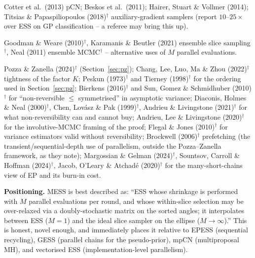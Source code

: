 \documentclass[11pt,a4paper]{article}
\theoremstyle{remark}
\begin{document}
\begin{description}[leftmargin=*,style=nextline]
\item[Function-space / dimension-robust samplers] Cotter et al.\ (2013) pCN; Beskos et al.\ (2011); Hairer, Stuart \& Vollmer (2014); Titsias \& Papaspiliopoulos (2018)$^\dagger$ auxiliary-gradient samplers (report $10$--$25\times$ over ESS on GP classification -- a referee may bring this up).
\item[Ensemble / population methods] Goodman \& Weare (2010)$^\dagger$, Karamanis \& Beutler (2021) ensemble slice sampling$^\dagger$, Neal (2011) ensemble MCMC$^\dagger$ -- alternative uses of $M$ parallel evaluations.
\item[Fundamental limits, non-reversibility, many short chains] Pozza \& Zanella (2024)$^\dagger$ (Section~\ref{sec:pz}); Chang, Lee, Luo, Ma \& Zhou (2022)$^\dagger$ tightness of the factor $K$; Peskun (1973)$^\dagger$ and Tierney (1998)$^\dagger$ for the ordering used in Section~\ref{sec:pz}; Bierkens (2016)$^\dagger$ and Sun, Gomez \& Schmidhuber (2010)$^\dagger$ for ``non-reversible $\le$ symmetrised'' in asymptotic variance; Diaconis, Holmes \& Neal (2000)$^\dagger$, Chen, Lov\'asz \& Pak (1999)$^\dagger$, Andrieu \& Livingstone (2021)$^\dagger$ for what non-reversibility can and cannot buy; Andrieu, Lee \& Livingstone (2020)$^\dagger$ for the involutive-MCMC framing of the proof; Flegal \& Jones (2010)$^\dagger$ for variance estimators valid without reversibility; Brockwell (2006)$^\dagger$ prefetching (the transient/sequential-depth use of parallelism, outside the Pozza--Zanella framework, as they note); Margossian \& Gelman (2024)$^\dagger$, Sountsov, Carroll \& Hoffman (2024)$^\dagger$, Jacob, O'Leary \& Atchad\'e (2020)$^\dagger$ for the many-short-chains view of EP and its burn-in cost.
\end{description}
\textbf{Positioning.} MESS is best described as: ``ESS whose shrinkage is performed with $M$ parallel evaluations per round, and whose within-slice selection may be over-relaxed via a doubly-stochastic matrix on the sorted angles; it interpolates between ESS ($M=1$) and the ideal slice sampler on the ellipse ($M\to\infty$).'' This is honest, novel enough, and immediately places it relative to EPESS (sequential recycling), GESS (parallel chains for the pseudo-prior), mpCN (multiproposal MH), and vectorised ESS (implementation-level parallelism).

\end{document}
